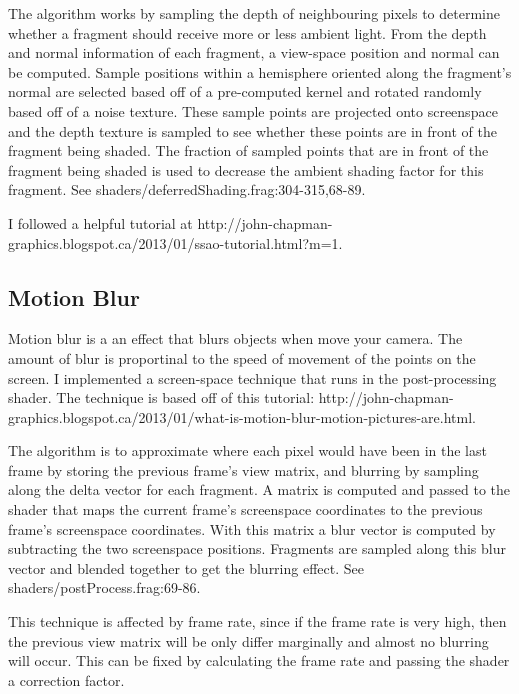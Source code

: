 \documentclass{book}
\begin{document}
      The algorithm works by sampling the depth of neighbouring pixels to determine whether a fragment should receive more or less ambient light. From the depth and normal information of each fragment, a view-space position and normal can be computed. Sample positions within a hemisphere oriented along the fragment's normal are selected based off of a pre-computed kernel and rotated randomly based off of a noise texture. These sample points are projected onto screenspace and the depth texture is sampled to see whether these points are in front of the fragment being shaded. The fraction of sampled points that are in front of the fragment being shaded is used to decrease the ambient shading factor for this fragment. See shaders/deferredShading.frag:304-315,68-89.

      I followed a helpful tutorial at http://john-chapman-graphics.blogspot.ca/2013/01/ssao-tutorial.html?m=1.


    \subsection{Motion Blur} \label{motion-blur}
      Motion blur is a an effect that blurs objects when move your camera. The amount of blur is proportinal to the speed of movement of the points on the screen.
      I implemented a screen-space technique that runs in the post-processing shader. The technique is based off of this tutorial: http://john-chapman-graphics.blogspot.ca/2013/01/what-is-motion-blur-motion-pictures-are.html.

      The algorithm is to approximate where each pixel would have been in the last frame by storing the previous frame's view matrix, and blurring by sampling along the delta vector for each fragment. A matrix is computed and passed to the shader that maps the current frame's screenspace coordinates to the previous frame's screenspace coordinates. With this matrix a blur vector is computed by subtracting the two screenspace positions. Fragments are sampled along this blur vector and blended together to get the blurring effect. See shaders/postProcess.frag:69-86.

      This technique is affected by frame rate, since if the frame rate is very high, then the previous view matrix will be only differ marginally and almost no blurring will occur. This can be fixed by calculating the frame rate and passing the shader a correction factor.
\end{document}
